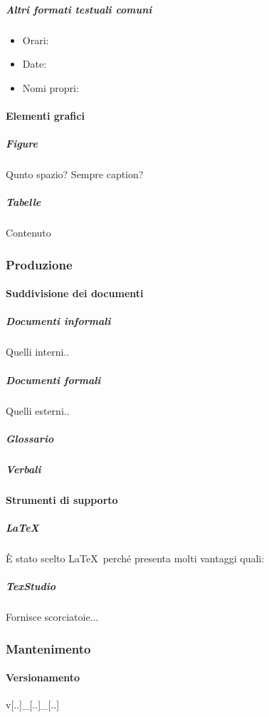 			\subparagraph{Altri formati testuali comuni} %
			\begin{itemize}
				\item Orari:
				\item Date:
				\item Nomi propri:
			\end{itemize}



			\paragraph{Elementi grafici}

			\subparagraph{Figure}
			Qunto spazio? Sempre caption?

			\subparagraph{Tabelle}
			Contenuto



		\subsubsection{Produzione}

			\paragraph{Suddivisione dei documenti}

			\subparagraph{Documenti informali}
			Quelli interni..

			\subparagraph{Documenti formali}
			Quelli esterni..

			\subparagraph{Glossario}

			\subparagraph{Verbali}



			\paragraph{Strumenti di supporto}

			\subparagraph{\LaTeX}
			È stato scelto \LaTeX \ perché presenta molti vantaggi quali:

			\subparagraph{TexStudio}
			Fornisce scorciatoie...


		\subsubsection{Mantenimento}

			\paragraph{Versionamento}
			v[..]\_[..]\_[..]	%

